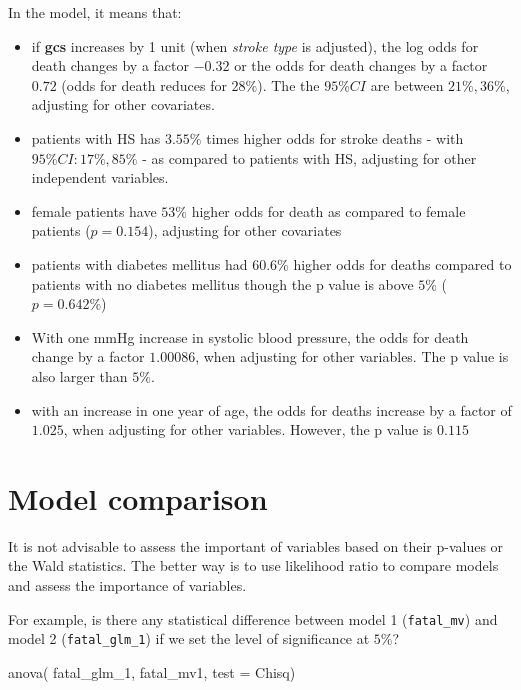 \documentclass[
  10pt,
]{krantz}
\newenvironment{Shaded}{\begin{snugshade}}{\end{snugshade}}
\newcommand{\AttributeTok}[1]{\textcolor[rgb]{0.77,0.63,0.00}{#1}}
\newcommand{\FunctionTok}[1]{\textcolor[rgb]{0.00,0.00,0.00}{#1}}
\newcommand{\NormalTok}[1]{#1}
\newcommand{\StringTok}[1]{\textcolor[rgb]{0.31,0.60,0.02}{#1}}
\providecommand{\tightlist}{%
  \setlength{\itemsep}{0pt}\setlength{\parskip}{0pt}}
\begin{document}
In the model, it means that:

\begin{itemize}
\tightlist
\item
  if \textbf{gcs} increases by 1 unit (when \emph{stroke type} is adjusted), the log odds for death changes by a factor \(-0.32\) or the odds for death changes by a factor \(0.72\) (odds for death reduces for \(28\%\)). The the \(95\%CI\) are between \(21\%,36\%\), adjusting for other covariates.
\item
  patients with HS has \(3.55\%\) times higher odds for stroke deaths - with \(95\%CI : 17\%, 85\%\) - as compared to patients with HS, adjusting for other independent variables.
\item
  female patients have \(53\%\) higher odds for death as compared to female patients (\(p = 0.154\)), adjusting for other covariates
\item
  patients with diabetes mellitus had \(60.6\%\) higher odds for deaths compared to patients with no diabetes mellitus though the p value is above \(5\%\) (\(p = 0.642\%\))
\item
  With one mmHg increase in systolic blood pressure, the odds for death change by a factor \(1.00086\), when adjusting for other variables. The p value is also larger than \(5\%\).\\
\item
  with an increase in one year of age, the odds for deaths increase by a factor of \(1.025\), when adjusting for other variables. However, the p value is \(0.115\)
\end{itemize}

\hypertarget{model-comparison}{%
\section{Model comparison}\label{model-comparison}}

It is not advisable to assess the important of variables based on their p-values or the Wald statistics. The better way is to use likelihood ratio to compare models and assess the importance of variables.

For example, is there any statistical difference between model 1 (\texttt{fatal\_mv}) and model 2 (\texttt{fatal\_glm\_1}) if we set the level of significance at \(5\%\)?

\begin{Shaded}
\begin{Highlighting}[]
\FunctionTok{anova}\NormalTok{( fatal\_glm\_1, fatal\_mv1, }\AttributeTok{test =} \StringTok{\textquotesingle{}Chisq\textquotesingle{}}\NormalTok{)}
\end{Highlighting}
\end{Shaded}
\end{document}
